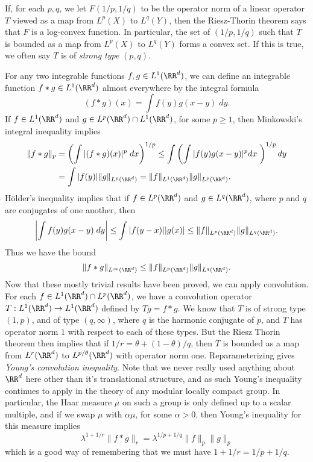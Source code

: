 If, for each $p,q$, we let $F(1/p,1/q)$ to be the operator norm of a linear operator $T$ viewed as a map from $L^p(X)$ to $L^q(Y)$, then the Riesz-Thorin theorem says that $F$ is a log-convex function. In particular, the set of $(1/p,1/q)$ such that $T$ is bounded as a map from $L^p(X)$ to $L^q(Y)$ forms a convex set. If this is true, we often say $T$ is of \emph{strong type} $(p,q)$.

\begin{example}
  For any two integrable functions $f,g \in L^1(\RR^d)$, we can define an integrable function $f * g \in L^1(\RR^d)$ almost everywhere by the integral formula
  \[ (f * g)(x) = \int f(y) g(x-y)\; dy. \]
  If $f \in L^1(\RR^d)$ and $g \in L^p(\RR^d) \cap L^1(\RR^d)$, for some $p \geq 1$, then Minkowski's integral inequality implies
  \begin{align*}
      \| f * g \|_p &= \left( \int |(f * g)(x)|^p\; dx \right)^{1/p} \leq \int \left( \int |f(y)g(x-y)|^p dx\; \right)^{1/p} dy\\
      &= \int |f(y)| \| g \|_{L^p(\RR^d)} = \| f \|_{L^1(\RR^d)} \| g \|_{L^p(\RR^d)}.
  \end{align*}
  H\"{o}lder's inequality implies that if $f \in L^p(\RR^d)$ and $g \in L^q(\RR^d)$, where $p$ and $q$ are conjugates of one another, then
  \begin{align*}
    \left| \int f(y) g(x-y)\; dy \right| \leq \int |f(y-x)| |g(x)| \leq \| f \|_{L^p(\RR^d)} \| g \|_{L^q(\RR^d)}.
  \end{align*}
    Thus we have the bound
    \[ \| f * g \|_{L^\infty(\RR^d)} \leq \| f \|_{L^p(\RR^d)} \| g \|_{L^q(\RR^d)}. \]
    Now that these mostly trivial results have been proved, we can apply convolution. For each $f \in L^1(\RR^d) \cap L^p(\RR^d)$, we have a convolution operator $T: L^1(\RR^d) \to L^1(\RR^d)$ defined by $Tg = f * g$. We know that $T$ is of strong type $(1,p)$, and of type $(q,\infty)$, where $q$ is the harmonic conjugate of $p$, and $T$ has operator norm $1$ with respect to each of these types. But the Riesz Thorin theorem then implies that if $1/r = \theta + (1 - \theta)/q$, then $T$ is bounded as a map from $L^r(\RR^d)$ to $L^{p/\theta}(\RR^d)$ with operator norm one. Reparameterizing gives \emph{Young's convolution inequality}. Note that we never really used anything about $\RR^d$ here other than it's translational structure, and as such Young's inequality continues to apply in the theory of any modular locally compact group. In particular, the Haar measure $\mu$ on such a group is only defined up to a scalar multiple, and if we swap $\mu$ with $\alpha \mu$, for some $\alpha > 0$, then Young's inequality for this measure implies
    \[ \lambda^{1 + 1/r} \| f * g \|_r = \lambda^{1/p + 1/q} \| f \|_p \| g \|_p \]
    which is a good way of remembering that we must have $1 + 1/r = 1/p + 1/q$.
\end{example}

